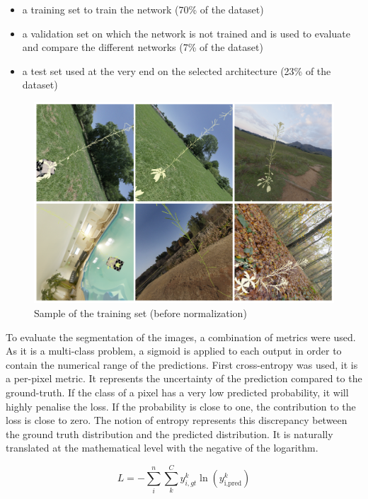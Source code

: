 \begin{itemize}
    \item a training set to train the network (70\% of the dataset)
    \item a validation set on which the network is not trained and
    is used to evaluate and compare the different networks (7\%
    of the dataset) \item a test set used at the very end on the
    selected architecture (23\% of the dataset)
\end{itemize}

\begin{figure}[h!]
	\centering \includegraphics[width = 0.9\linewidth]{figures/vscan_sample.png}
	\caption{Sample of the training set (before normalization)} \label{fig:trainset}
\end{figure}


To evaluate the segmentation of the images, a combination of
metrics were used. As it is a multi-class problem, a sigmoid is
applied to each output in order to contain the numerical range of
the predictions. First cross-entropy was used, it is a per-pixel
metric. It represents the uncertainty of the prediction compared to
the ground-truth. If the class of a pixel has a very low predicted
probability, it will highly penalise the loss. If the probability
is close to one, the contribution to the loss is close to zero. The
notion of entropy represents this discrepancy between the ground truth
distribution and the predicted distribution. It is naturally translated
at the mathematical level with the negative of the logarithm.

\begin{equation}
    L =-\sum_i^n\sum_k^C{y^k_{i, gt}\ln(y_{\textrm{i},
    \textrm{pred}}^k)}
\end{equation}

